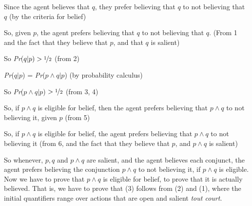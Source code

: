 \begin{enumerate*}
\item Since the agent believes that \(q\), they prefer believing that \(q\) to not believing that \(q\) (by the criteria for belief)
\item So, given \(p\), the agent prefers believing that \(q\) to not believing that \(q\). (From 1 and the fact that they believe that \(p\), and that \(q\) is salient)
\item So \textit{Pr}(\(q | p) > \nicefrac{1}{2}\) (from 2)
\item \textit{Pr}(\(q | p\)) = \textit{Pr}(\(p \wedge q | p\)) (by probability calculus)
\item So \textit{Pr}(\(p \wedge q | p\)) \(> \nicefrac{1}{2}\) (from 3, 4)
\item So, if \(p \wedge q\) is eligible for belief, then the agent prefers believing that \(p \wedge q\) to not believing it, given \(p\) (from 5)
\item So, if \(p \wedge q\) is eligible for belief, the agent prefers believing that \(p \wedge q\) to not believing it (from 6, and the fact that they believe that \(p\), and \(p \wedge q\) is salient)
\end{enumerate*}

\noindent So whenever, \(p, q\) and \(p \wedge q\) are salient, and the agent believes each conjunct, the agent prefers believing the conjunction \(p \wedge q\) to not believing it, if \(p \wedge q\) is eligible. Now we have to prove that \(p \wedge q\) is eligible for belief, to prove that it is actually believed. That is, we have to prove that (3) follows from (2) and (1), where the initial quantifiers range over actions that are open and salient \textit{tout court}.

